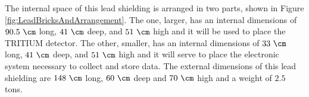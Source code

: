 The internal space of this lead shielding is arranged in two parts, shown in Figure \ref{fig:LeadBricksAndArrangement}. The one, larger, has an internal dimensions of $90.5~\cm$ long, $41~\cm$ deep, and $51~\cm$ high and it will be used to place the TRITIUM detector. The other, smaller, has an internal dimensions of $33~\cm$ long, $41~\cm$ deep, and $51~\cm$ high and it will serve to place the electronic system necessary to collect and store data. The external dimensions of this lead shielding are $148~\cm$ long, $60~\cm$ deep and $70~\cm$ high and a weight of $2.5$ tons.


